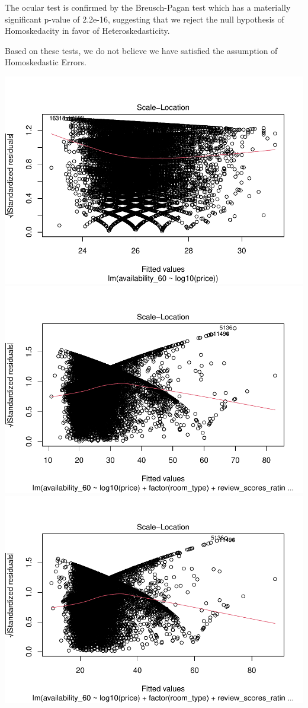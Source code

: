 \documentclass[
]{article}
\begin{document}
The ocular test is confirmed by the Breusch-Pagan test which has a materially significant p-value of ​​2.2e-16, suggesting that we reject the null hypothesis of Homoskedacity in favor of Heteroskedasticity.

Based on these tests, we do not believe we have satisfied the assumption of Homoskedastic Errors.

\includegraphics{lab2_report_files/figure-latex/homoskedastic_errors_plots-1.pdf} \includegraphics{lab2_report_files/figure-latex/homoskedastic_errors_plots-2.pdf} \includegraphics{lab2_report_files/figure-latex/homoskedastic_errors_plots-3.pdf}
\end{document}
